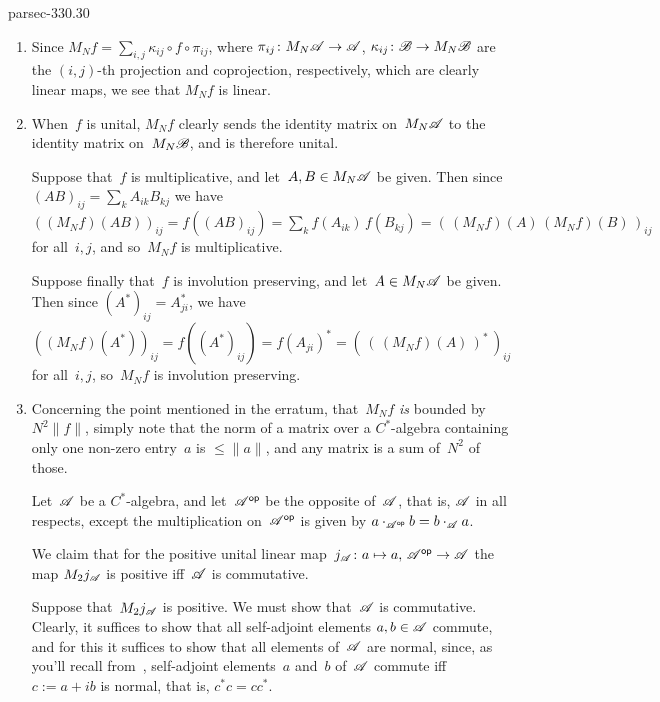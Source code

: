 \documentclass[b5page]{book}
\begin{document}
\begin{solution}{parsec-330.30}%
\begin{enumerate}
\item 
Since  $M_Nf = \sum_{i,j} \kappa_{ij}\circ f\circ \pi_{ij}$,
where  $\pi_{ij}\colon M_N\mathscr{A}\to \mathscr{A}$, 
$\kappa_{ij}\colon \mathscr{B}\to M_N\mathscr{B}$
are the $(i,j)$-th projection and coprojection, respectively,
which are clearly linear maps,
we see 
that $M_Nf$ is linear.
\item
When~$f$ is unital, $M_Nf$ clearly sends the identity matrix 
on~$M_N\mathscr{A}$ to the identity matrix on~$M_N\mathscr{B}$,
and is therefore unital.

Suppose that~$f$ is multiplicative,
and let~$A,B\in M_N\mathscr{A}$ be given.
Then since $(AB)_{ij} = \sum_k A_{ik} B_{kj}$
we have $((M_Nf)(AB))_{ij}
= f((AB)_{ij})
= \sum_k f(A_{ik})\,f(B_{kj})
= (\,(M_Nf)(A)\,(M_Nf)(B)\,)_{ij}$ for all~$i,j$,
and so~$M_Nf$ is multiplicative.

Suppose finally that~$f$ is involution preserving,
and let~$A\in M_N\mathscr{A}$ be given.
Then since $(A^*)_{ij}=A_{ji}^*$,
we have
$((M_Nf)(A^*))_{ij}
= f((A^*)_{ij})
= f(A_{ji})^*
= (\,(\,(M_Nf)(A)\,)^*\,)_{ij}$
for all~$i,j$,
so~$M_N f$ is involution preserving.
\item
Concerning the point mentioned in the erratum,
that~$M_Nf$ \emph{is}
bounded by~$N^2\|f\|$,
simply note that 
the norm of a matrix over a $C^*$-algebra
containing only one non-zero entry~$a$
is $\leq \|a\|$,
and any matrix is a sum of~$N^2$ of those.

Let~$\mathscr{A}$ be a $C^*$-algebra,
and let~${\mathscr{A}}{^{\mathsf{op}}}$ be the opposite of~$\mathscr{A}$,
that is, $\mathscr{A}$ in all respects, except the multiplication
on~${\mathscr{A}}{^{\mathsf{op}}}$ is given by 
$a\cdot_{{\mathscr{A}}{^{\mathsf{op}}}} b = b\cdot_{\mathscr{A}} a$.

We claim that for the positive unital
linear map~$j_{\mathscr{A}} \colon a\mapsto a,\, {\mathscr{A}}{^{\mathsf{op}}}\to\mathscr{A}$
the map $M_2 j_{\mathscr{A}}$ is
 positive iff~$\mathscr{A}$ is commutative.

Suppose that~$M_2 j_{\mathscr{A}}$ is positive.
We must show that~$\mathscr{A}$ is commutative.
Clearly, it suffices to show that all self-adjoint
elements $a,b\in \mathscr{A}$ commute,
and for this it suffices to show that all elements of~$\mathscr{A}$ 
are normal,
since, as you'll recall from~,
self-adjoint elements~$a$ and~$b$ of~$\mathscr{A}$ commute
iff $c:=a+ib$ is normal,
that is, $c^*c=cc^*$.


\end{enumerate}
\end{solution}
\end{document}
